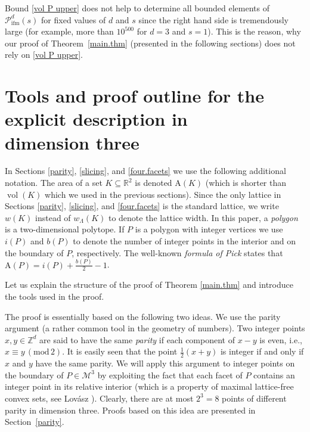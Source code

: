 \documentclass[a4paper]{article}
\theoremstyle{plain}
\begin{document}
Bound \eqref{vol P upper} does not help to determine all bounded elements of ${{\mathcal{P}}_{{\mathop{\mathrm{{ifm}}}}}^{{d}}({s})}$ for fixed values of $d$ and $s$ since the right hand side is tremendously large (for example, more than $10^{500}$ for $d = 3$ and $s = 1$). This is the reason, why our proof of Theorem~\ref{main.thm} (presented in the following sections) does not rely on \eqref{vol P upper}.

\section{Tools and proof outline for the explicit description in\\ 
  dimension three} \label{notions}

In Sections \ref{parity},
\ref{slicing}, and \ref{four.facets} we use the following additional notation. The area of a set $K \subseteq {\mathbb{R}}^2$ is denoted ${\mathrm{A}}(K)$
(which is shorter than ${{\mathop{\mathrm{{vol}}}}}(K)$ which we used in the
previous sections). 
Since the only lattice in Sections \ref{parity},
\ref{slicing}, and \ref{four.facets} is the standard
lattice, we write $w(K)$ instead of
$w_\Lambda(K)$ to denote the
lattice width. In this
paper, a \emph{polygon} is a two-dimensional polytope.
If $P$ is a polygon with integer vertices we use $i(P)$ and
$b(P)$ to denote the number of integer points in the
interior and on the boundary of $P$, respectively.  The well-known {\emph{{formula of Pick}}} states that ${\mathrm{A}}(P) = i(P)
+ \frac{b(P)}{2} - 1$. 

Let us explain the structure of the proof of Theorem
\ref{main.thm} and introduce the tools used in the proof.

The proof is essentially based on the following two ideas. 
We use the parity argument (a rather common tool in the geometry of numbers).
Two integer points $x,y \in {\mathbb{Z}}^d$ are said to have the same
\emph{parity} if each component of $x-y$ is even, i.e., $x
\equiv y {\, (\mathrm{mod} \, {2})}$.
It is easily seen that the point $\frac{1}{2}(x+y)$ is
integer if and only if $x$ and $y$ have the same parity.
We will apply this argument to integer points on the
boundary of $P \in {\mathcal{M}^3}$ by exploiting the fact that each
facet of $P$ contains an integer point in its relative
interior (which is a property of maximal lattice-free convex
sets, see Lov\'{a}sz \cite{Lovasz89}).
Clearly, there are at most $2^3 = 8$ points of different
parity in dimension three.
Proofs based on this idea are presented in
Section~\ref{parity}.
\end{document}
